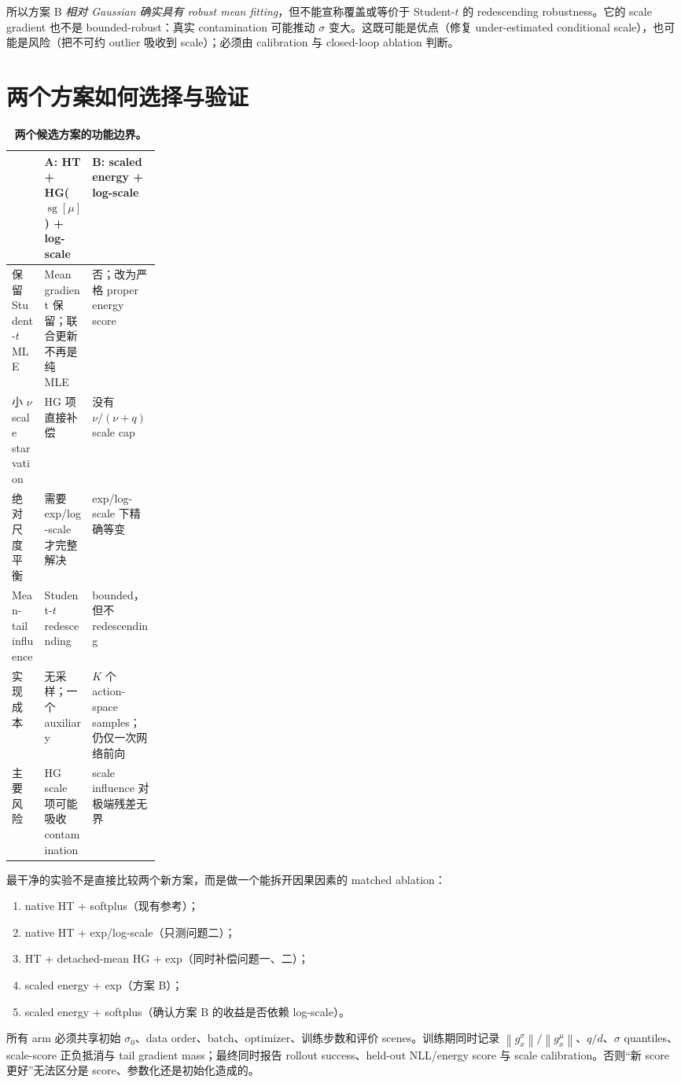 \documentclass[10pt]{article}
\newcommand{\sg}{\operatorname{sg}}
\newcommand{\norm}[1]{\left\lVert#1\right\rVert}
\begin{document}
所以方案 B \emph{相对 Gaussian 确实具有 robust mean fitting}，但不能宣称覆盖或等价于 Student-$t$ 的 redescending robustness。它的 scale gradient 也不是 bounded-robust：真实 contamination 可能推动 $\sigma$ 变大。这既可能是优点（修复 under-estimated conditional scale），也可能是风险（把不可约 outlier 吸收到 scale）；必须由 calibration 与 closed-loop ablation 判断。

\section{两个方案如何选择与验证}

\begin{table}[h]
\centering
\caption{\textbf{两个候选方案的功能边界。}}
\label{tab:solutions}
\small
\begin{tabularx}{\linewidth}{@{}p{0.22\linewidth}XX@{}}
\toprule
 & A: HT + HG($\sg[\mu]$) + log-scale & B: scaled energy + log-scale \\
\midrule
保留 Student-$t$ MLE & Mean gradient 保留；联合更新不再是纯 MLE & 否；改为严格 proper energy score \\
小 $\nu$ scale starvation & HG 项直接补偿 & 没有 $\nu/(\nu+q)$ scale cap \\
绝对尺度平衡 & 需要 exp/log-scale 才完整解决 & exp/log-scale 下精确等变 \\
Mean-tail influence & Student-$t$ redescending & bounded，但不 redescending \\
实现成本 & 无采样；一个 auxiliary & $K$ 个 action-space samples；仍仅一次网络前向 \\
主要风险 & HG scale 项可能吸收 contamination & scale influence 对极端残差无界 \\
\bottomrule
\end{tabularx}
\end{table}

最干净的实验不是直接比较两个新方案，而是做一个能拆开因果因素的 matched ablation：
\begin{enumerate}
 \item native HT + softplus（现有参考）；
 \item native HT + exp/log-scale（只测问题二）；
 \item HT + detached-mean HG + exp（同时补偿问题一、二）；
 \item scaled energy + exp（方案 B）；
 \item scaled energy + softplus（确认方案 B 的收益是否依赖 log-scale）。
\end{enumerate}
所有 arm 必须共享初始 $\sigma_0$、data order、batch、optimizer、训练步数和评价 scenes。训练期同时记录 $\norm{g_x^\sigma}/\norm{g_x^\mu}$、$q/d$、$\sigma$ quantiles、scale-score 正负抵消与 tail gradient mass；最终同时报告 rollout success、held-out NLL/energy score 与 scale calibration。否则“新 score 更好”无法区分是 score、参数化还是初始化造成的。
\end{document}
